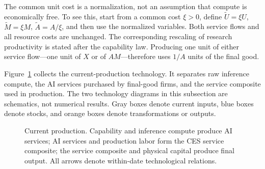 The common unit cost is a normalization, not an assumption that compute is
economically free. To see this, start from a common cost \(\xi>0\), define
\(\widetilde U=\xi U\), \(\widetilde M=\xi M\),
\(\widetilde A=A/\xi\), and then use the normalized variables. Both service
flows and all resource costs are unchanged. The corresponding rescaling of
research productivity is stated after the capability law. Producing one unit of
either service flow---one unit of \(X\) or of \(AM\)---therefore uses \(1/A\)
units of the final good.

Figure~\ref{fig:axm-current-production-flow} collects the current-production
technology. It separates raw inference compute, the AI services purchased by
final-good firms, and the service composite used in production. The two
technology diagrams in this subsection are schematics, not numerical results.
Gray boxes denote current inputs, blue boxes denote stocks, and orange boxes
denote transformations or outputs.

\begin{figure}[H]
 \centering
 \caption{Current production. Capability and inference compute produce AI
 services; AI services and production labor form the CES service composite;
 the service composite and physical capital produce final output. All arrows
 denote within-date technological relations.}
 \label{fig:axm-current-production-flow}
\end{figure}

